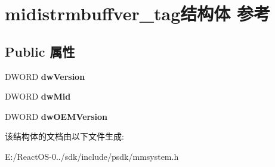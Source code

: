 \hypertarget{structmidistrmbuffver__tag}{}\section{midistrmbuffver\+\_\+tag结构体 参考}
\label{structmidistrmbuffver__tag}
\subsection*{Public 属性}
\begin{DoxyCompactItemize}
\item 
\mbox{\label{structmidistrmbuffver__tag_a5dce1be6adc87d9dfcfff99eedbc8027}} 
D\+W\+O\+RD {\bfseries dw\+Version}
\item 
\mbox{\label{structmidistrmbuffver__tag_a589013fe7919b1d0170ac729f6a65211}} 
D\+W\+O\+RD {\bfseries dw\+Mid}
\item 
\mbox{\label{structmidistrmbuffver__tag_a3f9f9293bbfa2fb36d8fd40756a1ed0f}} 
D\+W\+O\+RD {\bfseries dw\+O\+E\+M\+Version}
\end{DoxyCompactItemize}


该结构体的文档由以下文件生成\+:\begin{DoxyCompactItemize}
\item 
E\+:/\+React\+O\+S-\/0../sdk/include/psdk/mmsystem.\+h\end{DoxyCompactItemize}
